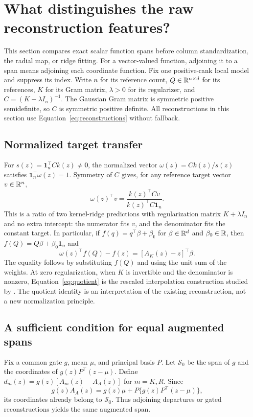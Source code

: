 
\section{What distinguishes the raw reconstruction features?}\label{sec:theory}
This section compares exact scalar function spans before column standardization, the radial map, or ridge fitting. For a vector-valued function, adjoining it to a span means adjoining each coordinate function. Fix one positive-rank local model and suppress its index. Write $n$ for its reference count, $Q\in\mathbb R^{n\times d}$ for its references, $K$ for its Gram matrix, $\lambda>0$ for its regularizer, and $C=(K+\lambda I_n)^{-1}$. The Gaussian Gram matrix is symmetric positive semidefinite, so $C$ is symmetric positive definite. All reconstructions in this section use Equation~\eqref{eq:reconstructions} without fallback.

\subsection{Normalized target transfer}
For $s(z)=\mathbf1_n^\top Ck(z)\ne0$, the normalized vector $\omega(z)=Ck(z)/s(z)$ satisfies $\mathbf1_n^\top\omega(z)=1$. Symmetry of $C$ gives, for any reference target vector $v\in\mathbb R^n$,
\begin{equation}
 \omega(z)^\top v=\frac{k(z)^\top Cv}{k(z)^\top C\mathbf1_n}.
 \label{eq:quotient}
\end{equation}
This is a ratio of two kernel-ridge predictions with regularization matrix $K+\lambda I_n$ and no extra intercept: the numerator fits $v$, and the denominator fits the constant target. In particular, if $f(q)=q^\top\beta+\beta_0$ for $\beta\in\mathbb R^d$ and $\beta_0\in\mathbb R$, then $f(Q)=Q\beta+\beta_0\mathbf1_n$ and
\[
 \omega(z)^\top f(Q)-f(z)=[A_K(z)-z]^\top\beta.
\]
The equality follows by substituting $f(Q)$ and using the unit sum of the weights. At zero regularization, when $K$ is invertible and the denominator is nonzero, Equation~\eqref{eq:quotient} is the rescaled interpolation construction studied by \citet{DeMarchi2017Rescaled}. The quotient identity is an interpretation of the existing reconstruction, not a new normalization principle.

\subsection{A sufficient condition for equal augmented spans}
Fix a common gate $g$, mean $\mu$, and principal basis $P$. Let $\mathcal S_0$ be the span of $g$ and the coordinates of $g(z)P^\top(z-\mu)$. Define $d_m(z)=g(z)[A_m(z)-A_A(z)]$ for $m=K,R$. Since
\[
 g(z)A_A(z)=g(z)\mu+P\{g(z)P^\top(z-\mu)\},
\]
its coordinates already belong to $\mathcal S_0$. Thus adjoining departures or gated reconstructions yields the same augmented span.

